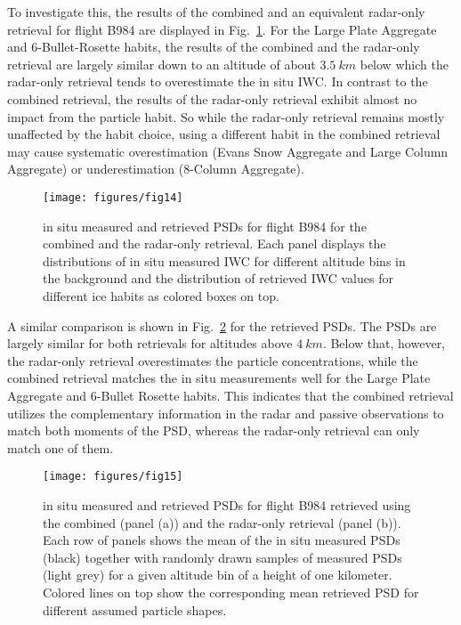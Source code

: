 \documentclass[journal abbreviation, manuscript]{copernicus}
\begin{document}
To investigate this, the results of the combined and an equivalent radar-only
retrieval for flight B984 are displayed in
Fig.~\ref{fig:in_situ_iwc_radar_only}. For the Large Plate Aggregate and
6-Bullet-Rosette habits, the results of the combined and the radar-only
retrieval are largely similar down to an altitude of about $3.5\ \unit{km}$
below which the radar-only retrieval tends to overestimate the in situ IWC. In
contrast to the combined retrieval, the results of the radar-only retrieval
exhibit almost no impact from the particle habit. So while the radar-only
retrieval remains mostly unaffected by the habit choice, using a different habit
in the combined retrieval may cause systematic overestimation (Evans Snow
Aggregate and Large Column Aggregate) or underestimation (8-Column Aggregate).

\begin{figure}[!hbpt]
  \centering
  \texttt{[image: figures/fig14]}
  \caption{in situ measured and retrieved PSDs for flight B984
    for the combined and the radar-only retrieval. Each panel displays
    the distributions of in situ measured IWC for different altitude
    bins in the background and the distribution of retrieved IWC values
    for different ice habits as colored boxes on top.}
  \label{fig:in_situ_iwc_radar_only}
\end{figure}

A similar comparison is shown in Fig.~\ref{fig:in_situ_psds_radar_only} for the
retrieved PSDs. The PSDs are largely similar for both retrievals for altitudes
above $4\ \unit{km}$. Below that, however, the radar-only retrieval
overestimates the particle concentrations, while the combined retrieval matches
the in situ measurements well for the Large Plate Aggregate and 6-Bullet Rosette
habits. This indicates that the combined retrieval utilizes the complementary
information in the radar and passive observations to match both moments of the
PSD, whereas the radar-only retrieval can only match one of them.

\begin{figure}[!hbpt]
  \centering
  \texttt{[image: figures/fig15]}
  \caption{in situ measured and retrieved PSDs for flight B984
    retrieved using the combined (panel (a)) and the radar-only retrieval
    (panel (b)). Each row of panels shows the mean of the in situ measured
    PSDs (black) together with randomly drawn samples of measured PSDs
    (light grey) for a given altitude bin of a height of one kilometer.
    Colored lines on top show the corresponding mean retrieved PSD for
    different assumed particle shapes.}
  \label{fig:in_situ_psds_radar_only}
\end{figure}
\end{document}
